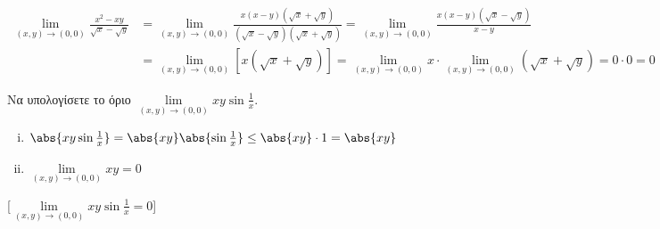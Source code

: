 \begin{example}
  \begin{align*}
    \lim\limits_{(x,y)\to (0, 0)} \frac{x^{2}-xy}{\sqrt{x} - \sqrt{y}} 
    &= \lim\limits_{(x,y)\to (0, 0)} \frac{x(x-y)(\sqrt{x} + \sqrt{y})}{(\sqrt{x} -
    \sqrt{y} )(\sqrt{x} + \sqrt{y})} = \lim\limits_{(x,y)\to (0, 0)}
    \frac{x(x-y)(\sqrt{x} - \sqrt{y} )}{x-y} \\
    &= \lim\limits_{(x,y)\to (0,0)} [x(\sqrt{x} + \sqrt{y})] = \lim\limits_{(x,y)\to
    (0, 0)} x \cdot \lim\limits_{(x,y)\to (0, 0)} (\sqrt{x} + \sqrt{y}) = 0 \cdot 0 = 0 
  \end{align*}
\end{example}


\begin{example}
  Να υπολογίσετε το όριο $ \lim\limits_{(x,y)\to (0, 0)} xy \sin{\frac{1}{x}} $. 

  \begin{solution}
  \item {}
    \begin{minipage}{0.42\textwidth}
      \begin{enumerate}[i)]
        \item $ \abs{xy \sin{\frac{1}{x}}} = \abs{xy} 
          \abs{\sin{\frac{1}{x}}} \leq \abs{xy} \cdot 1 = \abs{xy} $ 
          \hfill {}
        \item $ \lim\limits_{(x,y)\to (0, 0)} xy = 0$ \hfill {}
      \end{enumerate}
    \end{minipage}

    [$ \lim\limits_{(x,y)\to (0, 0)} xy 
    \sin{\frac{1}{x}} = 0$]
  \end{solution}
\end{example}


